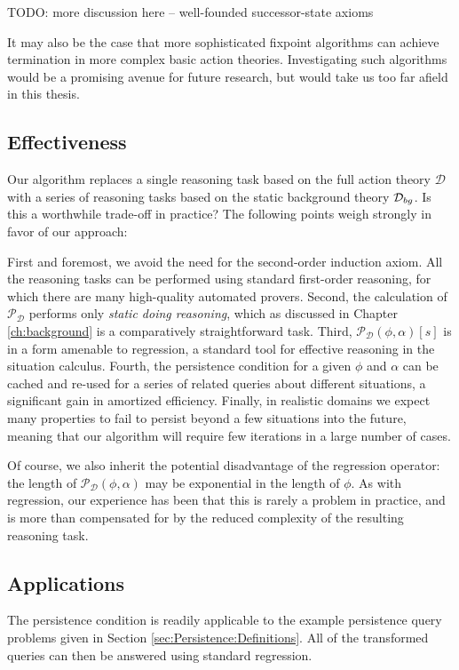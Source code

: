 TODO: more discussion here -- well-founded successor-state axioms

It may also be the case that more sophisticated fixpoint algorithms
can achieve termination in more complex basic action theories. Investigating
such algorithms would be a promising avenue for future research, but
would take us too far afield in this thesis.


\subsection{Effectiveness}

Our algorithm replaces a single reasoning task based on the full action
theory $\mathcal{D}$ with a series of reasoning tasks based on the
static background theory $\mathcal{D}_{bg}$. Is this a worthwhile trade-off
in practice? The following points weigh strongly in favor of our approach:

First and foremost, we avoid the need for the second-order induction
axiom. All the reasoning tasks can be performed using standard first-order
reasoning, for which there are many high-quality automated provers.
Second, the calculation of $\mathcal{P_{D}}$ performs only \emph{static
doing reasoning}, which as discussed in Chapter \ref{ch:background}
is a comparatively straightforward task. Third, $\mathcal{P}_{\mathcal{D}}(\phi,\alpha)[s]$
is in a form amenable to regression, a standard tool for effective
reasoning in the situation calculus. Fourth, the persistence condition
for a given $\phi$ and $\alpha$ can be cached and re-used for a
series of related queries about different situations, a significant
gain in amortized efficiency. Finally, in realistic domains we expect
many properties to fail to persist beyond a few situations into the
future, meaning that our algorithm will require few iterations in
a large number of cases.

Of course, we also inherit the potential disadvantage of the regression
operator: the length of $\mathcal{P_{D}}(\phi,\alpha)$ may be exponential
in the length of $\phi$. As with regression, our experience has been
that this is rarely a problem in practice, and is more than compensated
for by the reduced complexity of the resulting reasoning task.


\subsection{Applications}

The persistence condition is readily applicable to the example persistence
query problems given in Section \ref{sec:Persistence:Definitions}.
All of the transformed queries can then be answered using standard
regression.


